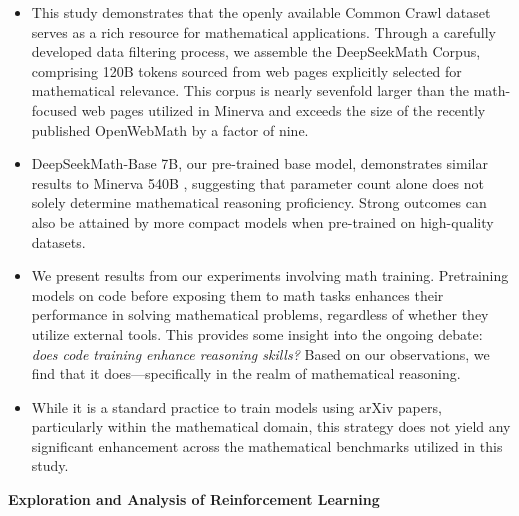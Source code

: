 \begin{itemize}[topsep=0pt]
    \item This study demonstrates that the openly available Common Crawl dataset serves as a rich resource for mathematical applications. Through a carefully developed data filtering process, we assemble the DeepSeekMath Corpus, comprising 120B tokens sourced from web pages explicitly selected for mathematical relevance. This corpus is nearly sevenfold larger than the math-focused web pages utilized in Minerva \citep{minerva} and exceeds the size of the recently published OpenWebMath \citep{openwebmath} by a factor of nine.

\item DeepSeekMath-Base 7B, our pre-trained base model, demonstrates similar results to Minerva 540B \citep{minerva}, suggesting that parameter count alone does not solely determine mathematical reasoning proficiency. Strong outcomes can also be attained by more compact models when pre-trained on high-quality datasets.

\item We present results from our experiments involving math training. Pretraining models on code before exposing them to math tasks enhances their performance in solving mathematical problems, regardless of whether they utilize external tools. This provides some insight into the ongoing debate: \textit{does code training enhance reasoning skills?} Based on our observations, we find that it does—specifically in the realm of mathematical reasoning.

\item While it is a standard practice to train models using arXiv papers, particularly within the mathematical domain, this strategy does not yield any significant enhancement across the mathematical benchmarks utilized in this study.
\end{itemize}

\textbf{Exploration and Analysis of Reinforcement Learning}

